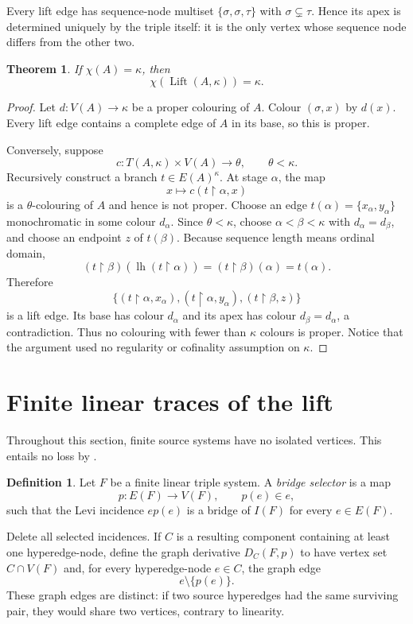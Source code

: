 \documentclass[11pt]{amsart}
\newtheorem{theorem}{Theorem}[section]
\theoremstyle{definition}
\newtheorem{definition}[definition]{Definition}
\theoremstyle{remark}
\numberwithin{equation}{section}
\newcommand{\Lift}{\operatorname{Lift}}
\newcommand{\lh}{\operatorname{lh}}
\newcommand{\restr}{\mathbin{\upharpoonright}}
\begin{document}
Every lift edge has sequence-node multiset $\{\sigma,\sigma,\tau\}$ with
$\sigma\subsetneq\tau$.  Hence its apex is determined uniquely by the
triple itself: it is the only vertex whose sequence node differs from the
other two.

\begin{theorem}
\label{thm:lift-chromatic}
If $\chi(A)=\kappa$, then
\[
 \chi(\Lift(A,\kappa))=\kappa.
\]
\end{theorem}

\begin{proof}
Let $d:V(A)\to\kappa$ be a proper colouring of $A$.  Colour
$(\sigma,x)$ by $d(x)$.  Every lift edge contains a complete edge of $A$
in its base, so this is proper.

Conversely, suppose
\[
 c:T(A,\kappa)\times V(A)\longrightarrow\theta,
 \qquad \theta<\kappa.
\]
Recursively construct a branch $t\in E(A)^\kappa$.  At stage $\alpha$,
the map
\[
 x\longmapsto c(t\restr\alpha,x)
\]
is a $\theta$-colouring of $A$ and hence is not proper.  Choose an edge
$t(\alpha)=\{x_\alpha,y_\alpha\}$ monochromatic in some colour
$d_\alpha$.  Since $\theta<\kappa$, choose $\alpha<\beta<\kappa$ with
$d_\alpha=d_\beta$, and choose an endpoint $z$ of $t(\beta)$.  Because
sequence length means ordinal domain,
\[
 (t\restr\beta)(\lh(t\restr\alpha))
   =(t\restr\beta)(\alpha)=t(\alpha).
\]
Therefore
\[
 \{(t\restr\alpha,x_\alpha),(t\restr\alpha,y_\alpha),
   (t\restr\beta,z)\}
\]
is a lift edge.  Its base has colour $d_\alpha$ and its apex has colour
$d_\beta=d_\alpha$, a contradiction.  Thus no colouring with fewer than
$\kappa$ colours is proper.  Notice that the argument used no regularity
or cofinality assumption on $\kappa$.
\end{proof}


\section{Finite linear traces of the lift}
\label{sec:trace}

Throughout this section, finite source systems have no isolated vertices.
This entails no loss by .

\begin{definition}
Let $F$ be a finite linear triple system.  A \emph{bridge selector} is a
map
\[
 p:E(F)\longrightarrow V(F),\qquad p(e)\in e,
\]
such that the Levi incidence $ep(e)$ is a bridge of $I(F)$ for every
$e\in E(F)$.

Delete all selected incidences.  If $C$ is a resulting component
containing at least one hyperedge-node, define the graph derivative
$D_C(F,p)$ to have vertex set $C\cap V(F)$ and, for every hyperedge-node
$e\in C$, the graph edge
\[
 e\setminus\{p(e)\}.
\]
These graph edges are distinct: if two source hyperedges had the same
surviving pair, they would share two vertices, contrary to linearity.
\end{definition}
\end{document}
